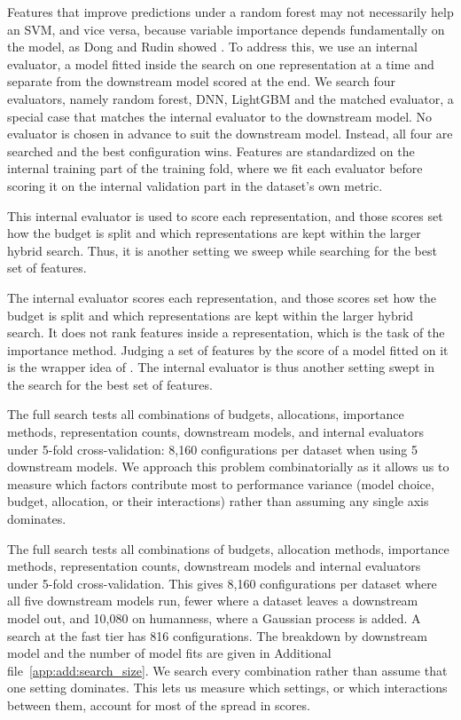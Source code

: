 Features that improve predictions under a random forest may not necessarily help an SVM, and vice versa, because variable importance depends fundamentally on the model, as Dong and Rudin showed \citep{Dong2020}. To address this, we use an internal evaluator, a model fitted inside the search on one representation at a time and separate from the downstream model scored at the end. We search four evaluators, namely random forest, DNN, LightGBM and the matched evaluator, a special case that matches the internal evaluator to the downstream model. No evaluator is chosen in advance to suit the downstream model. Instead, all four are searched and the best configuration wins. Features are standardized on the internal training part of the training fold, where we fit each evaluator before scoring it on the internal validation part in the dataset's own metric.

This internal evaluator is used to score each representation, and those scores set how the budget is split and which representations are kept within the larger hybrid search. Thus, it is another setting we sweep while searching for the best set of features.

The internal evaluator scores each representation, and those scores set how the budget is split and which representations are kept within the larger hybrid search. It does not rank features inside a representation, which is the task of the importance method. Judging a set of features by the score of a model fitted on it is the wrapper idea of \citet{Kohavi1997}. The internal evaluator is thus another setting swept in the search for the best set of features.



The full search tests all combinations of budgets, allocations, importance methods, representation counts, downstream models, and internal evaluators under 5-fold cross-validation: 8,160 configurations per dataset when using 5 downstream models. We approach this problem combinatorially as it allows us to measure which factors contribute most to performance variance (model choice, budget, allocation, or their interactions) rather than assuming any single axis dominates.

The full search tests all combinations of budgets, allocation methods, importance methods, representation counts, downstream models and internal evaluators under 5-fold cross-validation. This gives 8,160 configurations per dataset where all five downstream models run, fewer where a dataset leaves a downstream model out, and 10,080 on humanness, where a Gaussian process is added. A search at the fast tier has 816 configurations. The breakdown by downstream model and the number of model fits are given in Additional file~\ref{app:add:search_size}. We search every combination rather than assume that one setting dominates. This lets us measure which settings, or which interactions between them, account for most of the spread in scores.

